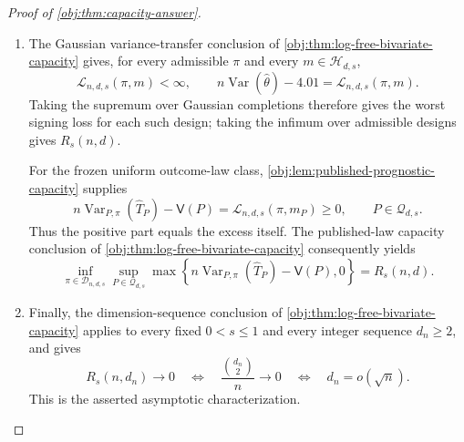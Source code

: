 \begin{proof}[Proof of \cref{obj:thm:capacity-answer}]
\begin{enumerate}
\item The Gaussian variance-transfer conclusion of \cref{obj:thm:log-free-bivariate-capacity} gives, for every admissible \(\pi\) and every \(m\in\mathcal H_{d,s}\),
\[
\mathcal L_{n,d,s}(\pi,m)<\infty,
\qquad
n\operatorname{Var}(\widehat\theta)-4.01
=\mathcal L_{n,d,s}(\pi,m).
\]
Taking the supremum over Gaussian completions therefore gives the worst signing loss for each such design; taking the infimum over admissible designs gives \(R_s(n,d)\).

For the frozen uniform outcome-law class, \cref{obj:lem:published-prognostic-capacity} supplies
\[
n\operatorname{Var}_{P,\pi}(\widehat T_P)-\mathsf V(P)
=\mathcal L_{n,d,s}(\pi,m_P)\geq0,
\qquad P\in\mathcal Q_{d,s}.
\]
Thus the positive part equals the excess itself. The published-law capacity conclusion of \cref{obj:thm:log-free-bivariate-capacity} consequently yields
\[
\inf_{\pi\in\mathcal D_{n,d,s}}
\sup_{P\in\mathcal Q_{d,s}}
\max\!\left\{
n\operatorname{Var}_{P,\pi}(\widehat T_P)-\mathsf V(P),0
\right\}
=R_s(n,d).
\]

\item Finally, the dimension-sequence conclusion of \cref{obj:thm:log-free-bivariate-capacity} applies to every fixed \(0<s\leq1\) and every integer sequence \(d_n\geq2\), and gives
\[
R_s(n,d_n)\longrightarrow0
\quad\Longleftrightarrow\quad
\frac{\binom{d_n}{2}}n\longrightarrow0
\quad\Longleftrightarrow\quad
d_n=o(\sqrt n).
\]
This is the asserted asymptotic characterization.
\end{enumerate}
\end{proof}
